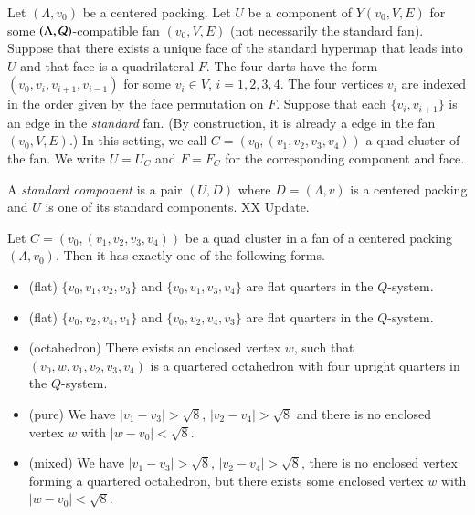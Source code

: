 \begin{definition}
Let $(\Lambda,v_0)$ be a centered packing.  Let $U$ be a component
of $Y(v_0,V,E)$ for some $(\Lambda,{\mathcal Q})$-compatible fan
$(v_0,V,E)$ (not necessarily the standard fan).
Suppose that there exists a unique face of the standard hypermap
that leads into $U$ and that face is a quadrilateral $F$.  
The 
four darts have the form $(v_0,v_i,v_{i+1},v_{i-1})$ for some $v_i\in V$,
$i=1,2,3,4$.  The  four vertices $v_i$ are indexed in the order given
by the face permutation on $F$.  Suppose that each $\{v_i,v_{i+1}\}$
is an edge in the {\it standard} fan.  (By construction, it is already a
edge in the fan $(v_0,V,E)$.)  In this setting, we call 
$C=(v_0,(v_1,v_2,v_3,v_4))$ a quad cluster of the fan.  We write
$U = U_C$ and $F= F_C$ for the corresponding component and face.
\end{definition}



\begin{definition} 
A {\it standard component\/} is a pair $(U,D)$ where $D=(\Lambda,v)$ is a
centered packing and $U$ is one of its standard components. 
XX Update.
\end{definition}
%

\begin{lemma}
Let $C=(v_0,(v_1,v_2,v_3,v_4))$ be a quad cluster in a fan
of a centered packing $(\Lambda,v_0)$.  Then it has
exactly one of the following forms.
\begin{itemize}
  \item (flat) $\{v_0,v_1,v_2,v_3\}$ and $\{v_0,v_1,v_3,v_4\}$ are flat
    quarters in the $Q$-system.
   \item (flat) $\{v_0,v_2,v_4,v_1\}$ and $\{v_0,v_2,v_4,v_3\}$ are flat
     quarters in the $Q$-system.
     \item (octahedron) There exists an enclosed vertex $w$, such that
       $(v_0,w,v_1,v_2,v_3,v_4)$ is a quartered octahedron with
       four upright quarters in the $Q$-system.
   \item (pure) We have $|v_1-v_3|>\sqrt8$, $|v_2-v_4|>\sqrt8$ and
     there is no enclosed vertex $w$ with $|w-v_0|<\sqrt8$.
    \item (mixed) We have $|v_1-v_3|>\sqrt8$, $|v_2-v_4|>\sqrt8$, there
      is no enclosed vertex forming a quartered octahedron, but
      there exists some enclosed vertex $w$ with $|w-v_0|<\sqrt8$.
\end{itemize}
\end{lemma}

